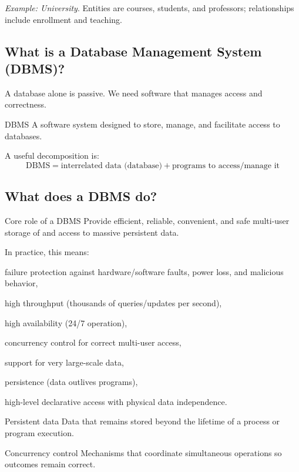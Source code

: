 \documentclass[../../dis.tex]{subfiles}
\begin{document}
\textit{Example: University}. Entities are courses, students, and professors; relationships include enrollment and teaching.

\subsection{What is a Database Management System (DBMS)?}
A database alone is passive. We need software that manages access and correctness.

\begin{concept}{DBMS}
A software system designed to store, manage, and facilitate access to databases.
\end{concept}

A useful decomposition is:
\[
\text{DBMS} = \text{interrelated data (database)} + \text{programs to access/manage it}
\]

\subsection{What does a DBMS do?}
\begin{concept}{Core role of a DBMS}
Provide efficient, reliable, convenient, and safe multi-user storage of and access to massive persistent data.
\end{concept}

In practice, this means:
\begin{dashlist}
    \item failure protection against hardware/software faults, power loss, and malicious behavior,
    \item high throughput (thousands of queries/updates per second),
    \item high availability (24/7 operation),
    \item concurrency control for correct multi-user access,
    \item support for very large-scale data,
    \item persistence (data outlives programs),
    \item high-level declarative access with physical data independence.
\end{dashlist}

\begin{concept}{Persistent data}
Data that remains stored beyond the lifetime of a process or program execution.
\end{concept}

\begin{concept}{Concurrency control}
Mechanisms that coordinate simultaneous operations so outcomes remain correct.
\end{concept}
\end{document}
